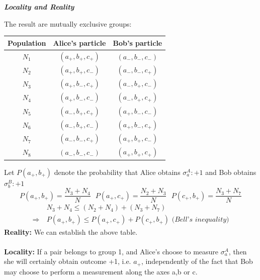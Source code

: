 \documentclass[]{article}
\theoremstyle{nonumberplain}
\begin{document}
\begin{itemize}
\begin{equation*}
\end{equation*}
\begin{center}
\textit{\textbf{Locality and Reality}}
\end{center}
The result are mutually exclusive groups:
\begin{center}
\begin{tabular}{|c|c|c|}
	\hline
	Population & Alice's particle & Bob's particle \\ 
	\hline 
	$N_{1}$ & $(a_{+},b_{+},c_{+})$ & $(a_{-},b_{-},c_{-})$ \\
	\hline 
	$N_{2}$ & $(a_{+},b_{+},c_{-})$ & $(a_{-},b_{-},c_{+})$ \\
	\hline 
	$N_{3}$ & $(a_{+},b_{-},c_{+})$ & $(a_{-},b_{+},c_{-})$ \\
	\hline 
	$N_{4}$ & $(a_{+},b_{-},c_{-})$ & $(a_{-},b_{+},c_{+})$ \\
	\hline 
	$N_{5}$ & $(a_{-},b_{+},c_{+})$ & $(a_{+},b_{-},c_{-})$ \\
	\hline 
	$N_{6}$ & $(a_{-},b_{+},c_{-})$ & $(a_{+},b_{-},c_{+})$ \\
	\hline 
	$N_{7}$ & $(a_{-},b_{-},c_{+})$ & $(a_{+},b_{+},c_{-})$ \\
	\hline 
	$N_{8}$ & $(a_{-},b_{-},c_{-})$ & $(a_{+},b_{+},c_{+})$ \\
	\hline
\end{tabular}
\end{center}
Let $P(a_{+},b_{+})$ denote the probability that Alice obtains $\sigma^{A}_{a}:+1$ and Bob obtains $\sigma^{B}_{b}:+1$
\[
	P(a_{+},b_{+}) = \frac{N_{3}+N_{4}}{N} \ \ \ P(a_{+},c_{+}) = \frac{N_{2}+N_{3}}{N} \ \ \ P(c_{+},b_{+}) = \frac{N_{3}+N_{7}}{N} 
\] 
\begin{equation*}
\begin{aligned}
	& N_{3}+N_{4} \leq (N_{2}+N_{4}) + (N_{3}+N_{7}) \\ 
	\Rightarrow\ & P(a_{+},b_{+}) \leq P(a_{+},c_{+}) + P(c_{+},b_{+}) \textit{\ \ (Bell's inequality)}
\end{aligned}
\end{equation*}
\textbf{Reality:} We can establish the above table. \\ \\
\textbf{Locality:}
If a pair belongs to group 1, and Alice's choose to measure $\sigma^{A}_{a}$, then she will certainly obtain outcome +1, i.e. $a_{+}$, independently of the fact that Bob may choose to perform a measurement along the axes a,b or c. \\
\begin{center}

\end{center}
\end{itemize}
\end{document}
